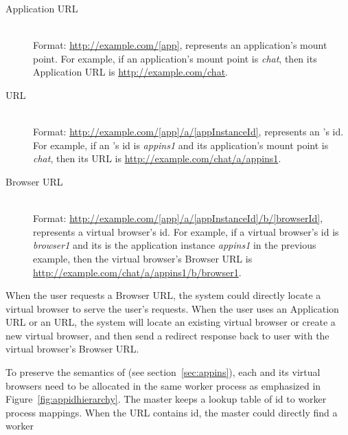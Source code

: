 \begin{description}

\item[Application URL] \label{itm:appurl} \hfill \\
Format: \url{http://example.com/[app]}, \code{[app]} represents an application's mount
point.   For example, if an application's mount point is \emph{chat},  then
its Application URL is \url{http://example.com/chat}.


\item[\appins{} URL] \label{itm:appinsurl} \hfill \\
Format: \url{http://example.com/[app]/a/[appInstanceId]}, \code{[appInstanceId]} represents an
\appins{}'s id.  For example, if an \appins{}'s id is \emph{appins1} and its
application's mount point is \emph{chat}, then its \appins{} URL
is  \url{http://example.com/chat/a/appins1}.


\item[Browser URL] \label{itm:vburl} \hfill \\
Format: \url{http://example.com/[app]/a/[appInstanceId]/b/[browserId]}, 
\code{[browserId]} represents a virtual browser's id. 
For example, if a virtual browser's id is \emph{browser1} and its \appins{} is the
application instance \emph{appins1} in the previous example, 
then the virtual browser's Browser URL is
\url{http://example.com/chat/a/appins1/b/browser1}.

\end{description}

When the user requests a Browser URL, the system could directly locate a virtual
browser to serve the user's requests. When the user uses an Application URL or
an \appins{} URL, the system will locate an existing virtual browser or create a
new virtual browser, and then send a redirect response back to user with the
virtual browser's Browser URL.


To preserve the semantics of  \appins (see section~\ref{sec:appins}), each
\appins and its virtual browsers need to be allocated in the same worker process
as emphasized in Figure~\ref{fig:appidhierarchy}. The master keeps a lookup
table of \appins id to worker process mappings. When the URL contains \appins
id,  the master could directly find a worker

